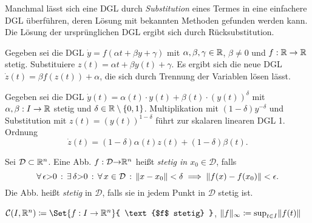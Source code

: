 \documentclass{cheat-sheet}
\newcommand{\D}{\mathcal{D}}
\begin{document}

\begin{technik}[Transformation]
  Manchmal lässt sich eine DGL durch \emph{Substitution} eines Termes in eine einfachere DGL überführen, deren Lösung mit bekannten Methoden gefunden werden kann. Die Lösung der ursprünglichen DGL ergibt sich durch Rücksubstitution.
\end{technik}

\begin{bsp}
  Gegeben sei die DGL $\dot{y} = f(\alpha t + \beta y + \gamma)$ mit $\alpha, \beta, \gamma \in \mathbb{R}$, $\beta \not= 0$ und $f : \mathbb{R} \to \mathbb{R}$ stetig. Substituiere $z(t) = \alpha t + \beta y(t) + \gamma$. Es ergibt sich die neue DGL $\dot{z}(t) = \beta f(z(t)) + \alpha$, die sich durch Trennung der Variablen lösen lässt.
\end{bsp}

\begin{bsp}
  Gegeben sei die DGL $\dot{y}(t) = \alpha(t) \cdot y(t) + \beta(t) \cdot (y(t))^{\delta}$ mit $\alpha, \beta : I \to \mathbb{R}$ stetig und $\delta \in \mathbb{R} \setminus \{0,1\}$. Multiplikation mit $(1-\delta) y^{-\delta}$ und Substitution mit $z(t) = (y(t))^{1-\delta}$ führt zur skalaren linearen DGL 1. Ordnung
  \[ \dot{z}(t) = (1-\delta) \alpha(t) z(t) + (1-\delta) \beta(t). \]
\end{bsp}






\begin{defn}
  Sei $\D \subset \R^n$. Eine Abb. $f : \D {\to} \R^n$ heißt \emph{stetig in $x_0 \in \D$}, falls
  \[ \fa{\epsilon {>} 0} \ex{\delta {>} 0} \fa{x \in \D} \norm{x - x_0} < \delta \implies \norm{f(x) - f(x_0)} < \epsilon. \]
  Die Abb. heißt \emph{stetig} in $\D$, falls sie in jedem Punkt in $\D$ stetig ist.
\end{defn}

\begin{nota}
  $\mathcal{C}(I, \R^n) \coloneqq \Set{ f : I \to \R^n }{ \text{$f$ stetig} }$, $\lVert f\rVert_\infty \coloneqq \sup_{t \in I} \lVert f(t)\rVert$
\end{nota}

\end{document}
